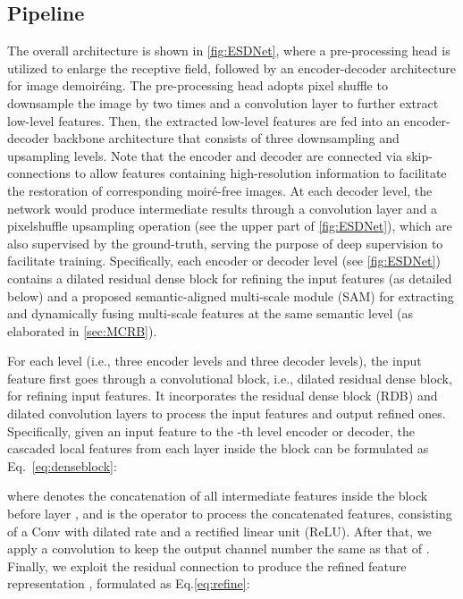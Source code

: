 \documentclass[runningheads]{llncs}
\newcommand{\ie}{i.e.}
\begin{document}
 
\subsection{Pipeline}
The overall architecture is shown in \cref{fig:ESDNet}, where a pre-processing head is utilized to enlarge the receptive field, followed by an encoder-decoder architecture for image demoiréing.
The pre-processing head adopts pixel shuffle \cite{shi2016real} to downsample the image by two times and a  convolution layer to further extract low-level features. 
Then, the extracted low-level features are fed into an encoder-decoder backbone architecture that consists of three downsampling and upsampling levels. Note that the encoder and decoder are connected via skip-connections to allow features containing high-resolution information to facilitate the restoration of corresponding moiré-free images. At each decoder level, the network would produce intermediate results through a convolution layer and a pixelshuffle upsampling operation (see the upper part of \cref{fig:ESDNet}), which are also supervised by the ground-truth, serving the purpose of deep supervision to facilitate training.
Specifically, each encoder or decoder level (see \cref{fig:ESDNet}) contains a dilated residual dense block  \cite{zhang2018residual,huang2017densely,he2016deep,yu2015multi} for refining the input features (as detailed below) and a proposed semantic-aligned multi-scale module (SAM) for extracting and dynamically fusing multi-scale features at the same semantic level (as elaborated in \cref{sec:MCRB}). 



For each level  (\ie, three encoder levels and three decoder levels), the input feature  first goes through a convolutional block, \ie, dilated residual dense block, for refining input features. It incorporates the residual dense block (RDB) \cite{zhang2018residual,huang2017densely,he2016deep} and dilated convolution layers \cite{yu2015multi} to process the input features and output refined ones. Specifically, given an input feature  to the -th level encoder or decoder, the cascaded local features from each layer inside the block can be formulated as Eq.~\eqref{eq:denseblock}:


where  denotes the concatenation of all intermediate features inside the block before layer , and  is the operator to process the concatenated features, consisting of a  Conv with dilated rate  and a rectified linear unit (ReLU). 
After that,
we apply a  convolution to keep the output channel number the same
as that of . Finally, we exploit the residual connection to produce the refined feature representation , formulated as Eq.\eqref{eq:refine}:
\end{document}
